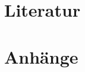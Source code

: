 \section{Literatur}
\label{sec:Literatur}
  \nocite{*} %
  \printbibliography[heading=none]

\section{Anhänge}
\label{sec:Anhänge}


